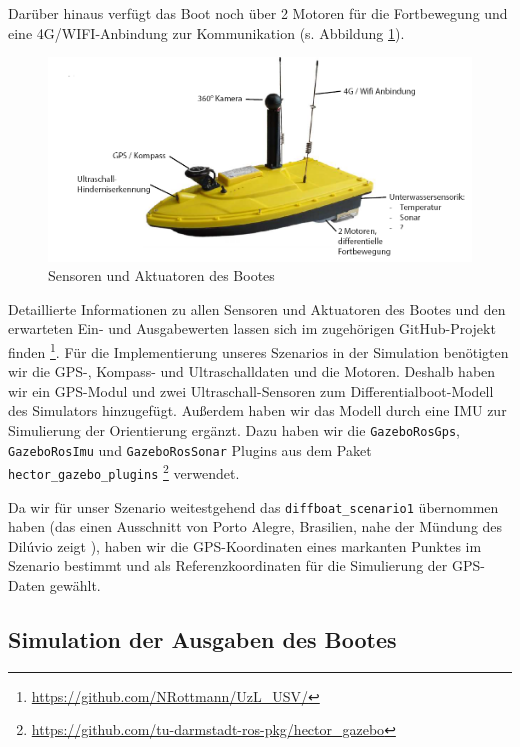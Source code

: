 \documentclass[11pt]{article}
\begin{document}
Darüber hinaus verfügt das Boot noch über 2 Motoren für die Fortbewegung und eine 4G/WIFI-Anbindung zur Kommunikation (s. Abbildung \ref{boot}).\\

\begin{figure}[h]
    \centering
	\includegraphics[width=0.9\linewidth]{boot.png}
	\caption{Sensoren und Aktuatoren des Bootes}
	\label{boot}
\end{figure}

Detaillierte Informationen zu allen Sensoren und Aktuatoren des Bootes und den erwarteten Ein- und Ausgabewerten lassen sich im zugehörigen GitHub-Projekt finden \footnote{\url{https://github.com/NRottmann/UzL_USV/}}.
Für die Implementierung unseres Szenarios in der Simulation benötigten wir die GPS-, Kompass- und Ultraschalldaten und die Motoren. Deshalb haben wir ein GPS-Modul und zwei Ultraschall-Sensoren zum Differentialboot-Modell des Simulators hinzugefügt. Außerdem haben wir das Modell durch eine IMU zur Simulierung der Orientierung ergänzt. Dazu haben wir die \texttt{GazeboRosGps}, \texttt{GazeboRosImu} und \texttt{GazeboRosSonar} Plugins aus dem Paket \texttt{hector\_gazebo\_plugins}  \footnote{\url{https://github.com/tu-darmstadt-ros-pkg/hector_gazebo}} verwendet.


Da wir für unser Szenario weitestgehend das \texttt{diffboat\_scenario1} übernommen haben (das einen Ausschnitt von Porto Alegre, Brasilien, nahe der Mündung des Dilúvio zeigt \cite{paravisi2019}), haben wir die GPS-Koordinaten eines markanten Punktes im Szenario bestimmt und als Referenzkoordinaten für die Simulierung der GPS-Daten gewählt.

\subsection{Simulation der Ausgaben des Bootes}
\end{document}
